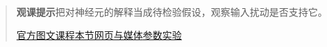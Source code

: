 \begin{quote}\small\textbf{观课提示}\quad 把对神经元的解释当成待检验假设，观察输入扰动是否支持它。

\href{https://www.3blue1brown.com/lessons/neural-network-analysis/}{官方图文课程}\quad\href{https://vitael04213.github.io/3blue1brown-notes/lessons/neural-network-analysis.html}{本节网页与媒体}\quad\href{https://vitael04213.github.io/3blue1brown-notes/lab.html\#network}{参数实验}
\end{quote}
